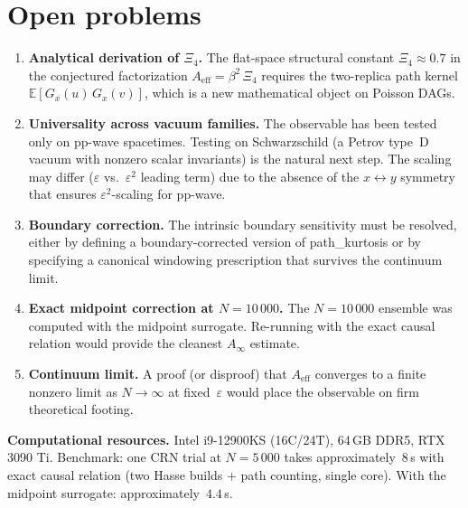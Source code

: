\documentclass[11pt,a4paper]{article}
\begin{document}
\section{Open problems}
\label{sec:open}

\begin{enumerate}
  \item \textbf{Analytical derivation of $\Xi_{4}$.}\;
    The flat-space structural constant $\Xi_{4} \approx 0.7$ in the conjectured factorization
    $A_{\mathrm{eff}} = \beta^{2}\,\Xi_{4}$ requires the two-replica path kernel
    $\mathbb{E}[G_{x}(u)\,G_{x}(v)]$, which is a new mathematical object on Poisson DAGs.

  \item \textbf{Universality across vacuum families.}\;
    The observable has been tested only on pp-wave spacetimes.  Testing on Schwarzschild
    (a Petrov type~D vacuum with nonzero scalar invariants) is the natural next step.  The
    scaling may differ ($\varepsilon$ vs.\ $\varepsilon^{2}$ leading term) due to the
    absence of the $x \leftrightarrow y$ symmetry that ensures $\varepsilon^{2}$-scaling
    for pp-wave.

  \item \textbf{Boundary correction.}\;
    The intrinsic boundary sensitivity must be resolved, either by defining a
    boundary-corrected version of path\_kurtosis or by specifying a canonical windowing
    prescription that survives the continuum limit.

  \item \textbf{Exact midpoint correction at $N = 10\,000$.}\;
    The $N = 10\,000$ ensemble was computed with the midpoint surrogate.  Re-running with
    the exact causal relation would provide the cleanest $A_{\infty}$ estimate.

  \item \textbf{Continuum limit.}\;
    A proof (or disproof) that $A_{\mathrm{eff}}$ converges to a finite nonzero limit as
    $N \to \infty$ at fixed~$\varepsilon$ would place the observable on firm theoretical
    footing.
\end{enumerate}


\bigskip
\noindent\textbf{Computational resources.}\;
Intel i9-12900KS (16C/24T), 64\,GB DDR5, RTX 3090 Ti.  Benchmark: one CRN trial at
$N = 5\,000$ takes approximately~$8$\,s with exact causal relation (two Hasse builds +
path counting, single core).  With the midpoint surrogate: approximately~$4.4$\,s.
\end{document}
